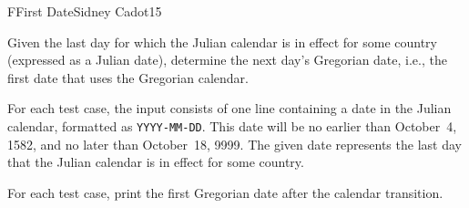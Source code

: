 \begin{icpcproblem}{F}{First Date}{Sidney Cadot}{15}

Given the last day for which the Julian calendar is in effect for some country (expressed as a Julian date),
determine the next day's Gregorian date, i.e., the first date that uses the Gregorian calendar.


For each test case, the input consists of one line containing a date in the Julian calendar, formatted as \texttt{YYYY-MM-DD}.
This date will be no earlier than October~4, 1582, and no later than October~18, 9999.
The given date represents the last day that the Julian calendar is in effect for some country.


For each test case, print the first Gregorian date after the calendar transition.


\end{icpcproblem}
